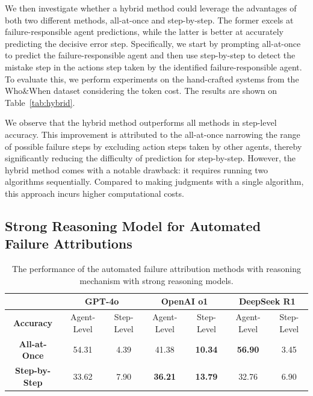 We then investigate whether a hybrid method could leverage the advantages of both two different methods, all-at-once and step-by-step. The former excels at failure-responsible agent predictions, while the latter is better at accurately predicting the decisive error step.
Specifically, we start by prompting all-at-once to predict the failure-responsible agent and then use step-by-step to detect the mistake step in the actions step taken by the identified failure-responsible agent. 
To evaluate this, we perform experiments on the hand-crafted systems from the Who\&When dataset considering the token cost.  The results are shown on Table~\ref{tab:hybrid}.

We observe that the hybrid method outperforms all methods in step-level accuracy.
This improvement is attributed to the all-at-once narrowing the range of possible failure steps by excluding action steps taken by other agents, thereby significantly reducing the difficulty of prediction for step-by-step. 
However, the hybrid method comes with a notable drawback: it requires running two algorithms sequentially. Compared to making judgments with a single algorithm, this approach incurs higher computational costs.



\subsection{Strong Reasoning Model for Automated Failure Attributions}
\label{app:reasoning}

\begin{table}[htb]
\centering
\setlength{\tabcolsep}{1.5 pt}
\begin{tabular}{ccccccc}
\toprule[1.5pt]
             \rowcolor{gray!50} & \multicolumn{2}{c}{\textbf{GPT-4o}}       & \multicolumn{2}{c}{\textbf{OpenAI o1}}    & \multicolumn{2}{c}{\textbf{DeepSeek R1}}  \\ \hline
    \textbf{Accuracy}         & Agent-Level & Step-Level & Agent-Level & Step-Level & Agent-Level & Step-Level \\ \hline
\textbf{All-at-Once}  &   54.31              &    4.39            &    41.38             &           \textbf{10.34}     &    \textbf{56.90}             &        3.45        \\
\textbf{Step-by-Step} &   33.62              &     7.90           &    \textbf{36.21}             &    \textbf{13.79}            &   32.76              &    6.90            \\ 
\bottomrule[1.5pt]
\end{tabular}
\label{table:reason_model}
\caption{The performance of the automated failure attribution methods with reasoning mechanism with strong reasoning models.}
\vspace{-10pt}
\end{table}

